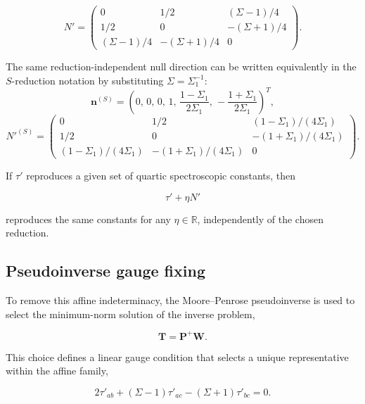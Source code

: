 \documentclass[aip,jcp,reprint,floatfix]{revtex4-2}
\begin{document}
\begin{equation}
N'=
\begin{pmatrix}
0 & 1/2 & (\Sigma-1)/4 \\
1/2 & 0 & -(\Sigma+1)/4 \\
(\Sigma-1)/4 & -(\Sigma+1)/4 & 0
\end{pmatrix}.
\end{equation}

The same reduction-independent null direction can be written
equivalently in the $S$-reduction notation by substituting
$\Sigma=\Sigma_1^{-1}$:
\begin{equation}
\mathbf n^{(S)} =
\left(
0,\,
0,\,
0,\,
1,\,
\frac{1-\Sigma_1}{2\Sigma_1},\,
-\frac{1+\Sigma_1}{2\Sigma_1}
\right)^T ,
\end{equation}
\begin{equation}
N'^{(S)}=
\begin{pmatrix}
0 & 1/2 & (1-\Sigma_1)/(4\Sigma_1) \\
1/2 & 0 & -(1+\Sigma_1)/(4\Sigma_1) \\
(1-\Sigma_1)/(4\Sigma_1) & -(1+\Sigma_1)/(4\Sigma_1) & 0
\end{pmatrix}.
\end{equation}

If $\tau'$ reproduces a given set of quartic spectroscopic constants,
then

\begin{equation}
\tau' + \eta N'
\end{equation}

reproduces the same constants for any $\eta \in \mathbb{R}$,
independently of the chosen reduction.

\subsection{Pseudoinverse gauge fixing}

To remove this affine indeterminacy, the Moore–Penrose pseudoinverse
is used to select the minimum-norm solution of the inverse problem,

\begin{equation}
\mathbf T = \mathbf P^{+} \mathbf W.
\end{equation}

This choice defines a linear gauge condition that selects a unique
representative within the affine family,

\begin{equation}
2\tau'_{ab}+(\Sigma-1)\tau'_{ac}-(\Sigma+1)\tau'_{bc}=0.
\label{eq:app_quartic_gauge}
\end{equation}
\end{document}
